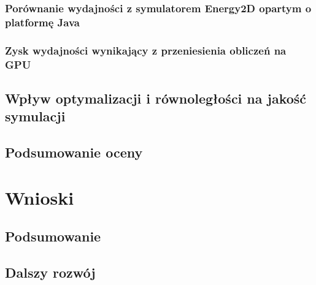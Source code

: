 \documentclass[pdflatex,11pt]{aghdpl}
\begin{document}
		\subsection{Porównanie wydajności z symulatorem Energy2D opartym o platformę Java}
		\subsection{Zysk wydajności wynikający z przeniesienia obliczeń na GPU}
	\section{Wpływ optymalizacji i równoległości na jakość symulacji}
	\section{Podsumowanie oceny}
	
\chapter{Wnioski}
	\section{Podsumowanie}
	\section{Dalszy rozwój}

%
%


% 
% 



%
%
%
%
\end{document}
